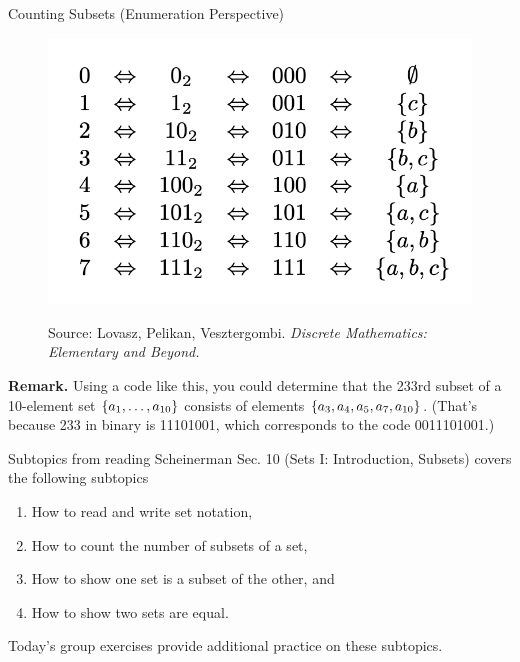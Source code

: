 \documentclass[10pt]{beamer}
\begin{document}
\begin{frame}{Counting Subsets (Enumeration Perspective)}

\begin{figure}
\includegraphics[width=.9\textwidth]{images/correspondence}

\tiny Source: Lovasz, Pelikan, Vesztergombi. \textit{Discrete Mathematics: Elementary and Beyond.} 	
\end{figure}

\vfill \vfill 
\footnotesize 
\textbf{Remark.} Using a code like this, you could determine that the 233rd subset of a 10-element set $\{ {a_1, \hdots, a_{10}} \}$ consists of elements $\{ {a_3, a_4, a_5, a_7, a_{10}} \}$. (That's because 233 in binary is 11101001, which corresponds to the code 0011101001.)
\end{frame}


\begin{frame}{Subtopics from reading}
Scheinerman Sec. 10 (Sets I: Introduction, Subsets) covers the following subtopics
\begin{enumerate}
	\item How to read and write set notation,
	\item How to count the number of subsets of a set,
	\item How to show one set is a subset of the other, and
	\item How to show two sets are equal.
\end{enumerate}

\vfill
Today's group exercises provide additional practice on these subtopics. 
\end{frame}
\end{document}
